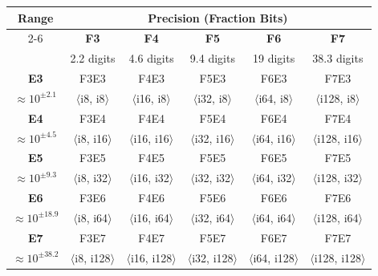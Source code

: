 \documentclass[12pt,letter]{article}
\begin{document}
\begin{lstlisting}[caption={FE Type Configurations - Precision vs. Range}, label={fig:spirix_configurations}]
\end{lstlisting}
\begin{table}[ht]
\centering
\renewcommand{\arraystretch}{1.5}
\begin{tabular}{|c|c|c|c|c|c|}
\hline
\multirow{2}{*}{\textbf{Range}} & \multicolumn{5}{c|}{\textbf{Precision (Fraction Bits)}} \\
\cline{2-6}
 & \textbf{F3} & \textbf{F4} & \textbf{F5} & \textbf{F6} & \textbf{F7} \\
 & \small{2.2 digits} & \small{4.6 digits} & \small{9.4 digits} & \small{19 digits} & \small{38.3 digits} \\
\hline
\textbf{E3} & F3E3 & F4E3 & F5E3 & F6E3 & F7E3 \\
\small{$\approx 10^{\pm2.1}$} & \small{$\langle$i8, i8$\rangle$} & \small{$\langle$i16, i8$\rangle$} & \small{$\langle$i32, i8$\rangle$} & \small{$\langle$i64, i8$\rangle$} & \small{$\langle$i128, i8$\rangle$} \\
\hline
\textbf{E4} & F3E4 & F4E4 & F5E4 & F6E4 & F7E4 \\
\small{$\approx 10^{\pm4.5}$} & \small{$\langle$i8, i16$\rangle$} & \small{$\langle$i16, i16$\rangle$} & \small{$\langle$i32, i16$\rangle$} & \small{$\langle$i64, i16$\rangle$} & \small{$\langle$i128, i16$\rangle$} \\
\hline
\textbf{E5} & F3E5 & F4E5 & F5E5 & F6E5 & F7E5 \\
\small{$\approx 10^{\pm9.3}$} & \small{$\langle$i8, i32$\rangle$} & \small{$\langle$i16, i32$\rangle$} & \small{$\langle$i32, i32$\rangle$} & \small{$\langle$i64, i32$\rangle$} & \small{$\langle$i128, i32$\rangle$} \\
\hline
\textbf{E6} & F3E6 & F4E6 & F5E6 & F6E6 & F7E6 \\
\small{$\approx 10^{\pm18.9}$} & \small{$\langle$i8, i64$\rangle$} & \small{$\langle$i16, i64$\rangle$} & \small{$\langle$i32, i64$\rangle$} & \small{$\langle$i64, i64$\rangle$} & \small{$\langle$i128, i64$\rangle$} \\
\hline
\textbf{E7} & F3E7 & F4E7 & F5E7 & F6E7 & F7E7 \\
\small{$\approx 10^{\pm38.2}$} & \small{$\langle$i8, i128$\rangle$} & \small{$\langle$i16, i128$\rangle$} & \small{$\langle$i32, i128$\rangle$} & \small{$\langle$i64, i128$\rangle$} & \small{$\langle$i128, i128$\rangle$} \\
\hline
\end{tabular}
\end{table}
\end{document}
